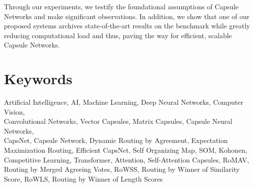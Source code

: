 \begin{otherlanguage}{english}
Through our experiments, we testify the foundational assumptions of Capsule Networks and make significant observations. In addition, we show that one of our proposed systems archives state-of-the-art results on the  benchmark while greatly reducing computational load and thus, paving the way for efficient, scalable Capsule Networks.
\section*{Keywords}
\noindent
Artificial Intelligence, AI, Machine Learning, Deep Neural Networks, Computer Vision,\\\mbox{Convolutional} Networks, Vector Capsules, Matrix Capsules, Capsule Neural Networks, \\\mbox{CapsNet}, Capsule Network, Dynamic Routing by Agreement, Expectation Maximization Routing, Efficient CapsNet, Self Organizing Map, SOM, Kohonen, Competitive Learning, Transformer, Attention, Self-Attention Capsules, RoMAV, Routing by Merged Agreeing Votes, RoWSS, Routing by Winner of Similarity Score, RoWLS, Routing by Winner of Length Scores

\end{otherlanguage}
